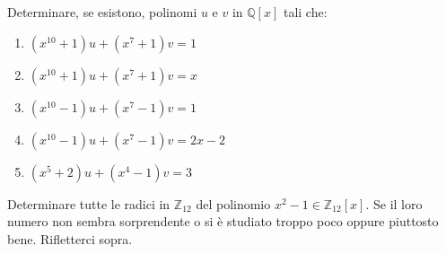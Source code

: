\begin{exsbox}
	Determinare, se esistono, polinomi $u$ e $v$ in $\mathbb{Q}[x]$ tali che:
	\begin{enumerate}
		\item $(x^{10}+1)u+(x^{7}+1)v=1$
		\item $(x^{10}+1)u+(x^{7}+1)v=x$
		\item $(x^{10}-1)u+(x^{7}-1)v=1$
		\item $(x^{10}-1)u+(x^{7}-1)v=2x-2$
		\item $(x^{5}+2)u+(x^{4}-1)v=3$
	\end{enumerate}
\end{exsbox}
\begin{exsbox}
	Determinare tutte le radici in $\mathbb{Z}_{12}$ del polinomio $x^{2}-1 \in \mathbb{Z}_{12}[x]$. Se il loro numero non sembra sorprendente o si è studiato troppo poco oppure piuttosto bene. Rifletterci sopra.
\end{exsbox}


